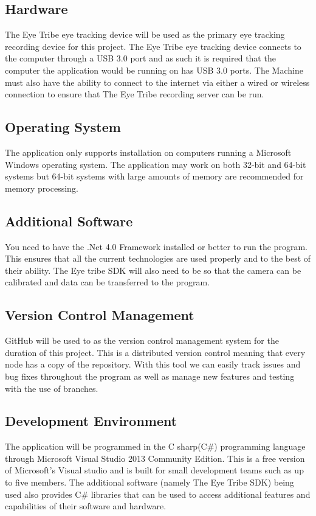 \subsection{Hardware}
The Eye Tribe eye tracking device will be used as the primary eye tracking recording device for this project. The Eye Tribe eye tracking device connects to the computer through a USB 3.0 port and as such it is required that the computer the application would be running on has USB 3.0 ports. The Machine must also have the ability to connect to the internet via either a wired or wireless connection to ensure that The Eye Tribe recording server can be run.

\subsection{Operating System}
The application only supports installation on computers running a Microsoft Windows operating system. The application may work on both 32-bit and 64-bit systems but 64-bit systems with large amounts of memory are recommended for memory processing. 

\subsection{Additional Software}
You need to have the .Net 4.0 Framework installed or better to run the program. This ensures that all the current technologies are used properly and to the best of their ability. The Eye tribe SDK will also need to be so that the camera can be calibrated and data can be transferred to the program.

\subsection{Version Control Management}
GitHub will be used to as the version control management system for the duration of this project.
This is a distributed version control meaning that every node has a copy of the repository. With this tool we can easily track issues and bug fixes throughout the program as well as manage new features and testing with the use of branches.

\subsection{Development Environment}
The application will be programmed in the C sharp(C\#) programming language through Microsoft Visual Studio 2013 Community Edition. This is a free version of Microsoft's Visual studio and is built for small development teams such as up to five members. The additional software (namely The Eye Tribe SDK) being used also provides C\# libraries that can be used to access additional features and capabilities of their software and hardware.
